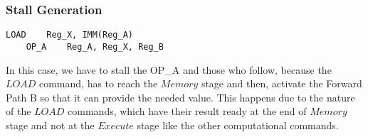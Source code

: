 \subsubsection{Stall Generation}
\label{3.2.6.4}
\begin{lstlisting}[caption={Stall Scenario},captionpos=b]
	LOAD 	Reg_X, IMM(Reg_A)
	OP_A	Reg_A, Reg_X, Reg_B
\end{lstlisting}

In this case, we have to stall the OP\_A and those who follow, because the $LOAD$ command, has to reach the $Memory$ stage and then, activate the Forward Path B so that it can provide the needed value. This happens due to the nature of the $LOAD$ commands, which have their result ready at the end of $Memory$ stage and not at the $Execute$ stage like the other computational commands.\\

